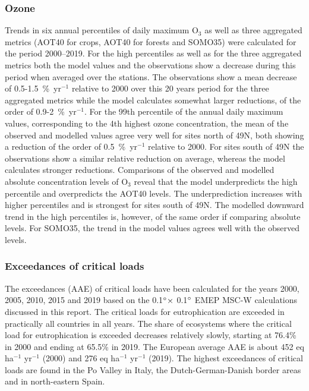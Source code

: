 \subsubsection*{Ozone}
Trends in six annual percentiles of daily maximum O$_3$ as well as three aggregated metrics (AOT40 for crops, AOT40 for forests and SOMO35) were calculated for the period 2000--2019. For the high percentiles as well as for the three aggregated metrics both the model values and the observations show a decrease during this period when averaged over the stations. The observations show a mean decrease of 0.5-1.5~\%~yr$^{-1}$ relative to 2000 over this 20 years period for the three aggregated metrics while the model calculates somewhat larger reductions, of the order of 0.9-2~\%~yr$^{-1}$. For the 99th percentile of the annual daily maximum values, corresponding to the 4th highest ozone concentration, the mean of the observed and modelled values agree very well for sites north of 49\degrees N, both showing a reduction of the order of 
0.5~\%~yr$^{-1}$ relative to 2000. For sites south of 49\degrees N the observations show a similar relative reduction on average, whereas the model calculates stronger reductions. Comparisons of the observed and modelled absolute concentration levels of O$_3$ reveal that the model underpredicts the high percentile and overpredicts the AOT40 levels. The underprediction increases with higher percentiles and is strongest for sites south of 49\degrees N. The modelled downward trend in the high percentiles is, however, of the same order if comparing absolute levels. For SOMO35, the trend in the model values agrees well with the observed levels.

\subsubsection*{Exceedances of critical loads}
The exceedances (AAE) of critical loads have been calculated for the years 2000, 2005, 2010, 2015 and 2019 based on the 0.1$^\circ \times$ 0.1$^\circ$ EMEP MSC-W calculations discussed in this report. The critical loads for eutrophication are exceeded in practically all countries in all years. The share of ecosystems where the critical load for eutrophication is exceeded decreases relatively slowly, starting at 76.4\% in 2000 and ending at 65.5\% in 2019. The European average AAE is about 452 eq ha$^{-1}$ yr$^{-1}$ (2000) and 276 eq
ha$^{-1}$ yr$^{-1}$ (2019). The highest exceedances of critical loads are found in the Po Valley in Italy, the
Dutch-German-Danish border areas and in north-eastern Spain.

